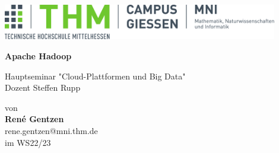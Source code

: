 \documentclass[%
	BCOR=8.25mm,         %
	DIV=12,              %
	parskip=half,				 %
	bibliography=totoc,	 %
	headsepline=on,      %
	]{scrbook}
\begin{document}
\frontmatter

\begin{titlepage}
	\begin{center}
	\includegraphics[width=0.9\textwidth]{img/mni-logo}
	
	\vspace{5cm}	

	\vspace{1cm}	

	\huge\textbf{\sffamily Apache Hadoop}

	\normalsize
	\vspace{1cm}	

	Hauptseminar "Cloud-Plattformen und Big Data" \\
	Dozent Steffen Rupp

	von \\[1cm]	

	\textbf{René Gentzen}\\ [.5cm] 
	rene.gentzen@mni.thm.de\\ [.5cm] 
	im WS22/23
	\end{center}
	\vfill
\end{titlepage}

\tableofcontents

\mainmatter 
\pagestyle{headings}










\backmatter 

\appendix

\printbibliography
\end{document}
